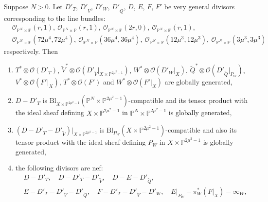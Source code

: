 \documentclass[10pt,a4paper]{amsart}
\newcommand{\BL}{\mathrm{Bl}}
\newcommand{\bP}{\mathbb{P}}
\newcommand{\calO}{\mathcal{O}}
\begin{document}
\begin{lemma} \label{lemmaWgloballygenerated}
	Suppose $N>0$.
	Let $D'_T$, $D'_{\widetilde{V}}$, $D'_W$, $D'_{\widetilde{Q}}$, $D$, $E$, $F$, $F'$ be very general divisors corresponding to the line bundles:
	\begin{equation}
		\begin{aligned}
			 & \calO_{\bP^N \times \bP}(r,1), \ \calO_{\bP^N \times \bP}(r,1), \ \calO_{\bP^N \times \bP}(2r,0), \ \calO_{\bP^N \times \bP}(r,1),                                             \\
			 & \calO_{\bP^N \times \bP}(72\mu^4,72\mu^4), \ \calO_{\bP^N \times \bP}(36\mu^4,36\mu^4), \ \calO_{\bP^N \times \bP}(12\mu^3,12\mu^3), \ \calO_{\bP^N \times \bP}(3\mu^3,3\mu^3)
		\end{aligned}
	\end{equation}
	respectively.
	Then
	\begin{enumerate}
		\item $T^* \otimes \calO(D'_T)$, $\widetilde{V}^* \otimes \calO(D'_{\widetilde{V}}|_{X \times \bP^{2\mu^2-1}})$, $W^* \otimes \calO(D'_W|_X)$, $\widetilde{Q}^* \otimes \calO(D'_{\widetilde{Q}}|_{P_W})$, $V^* \otimes \calO(F'|_X)$, $T^* \otimes \calO(F')$ and $W^* \otimes \calO(F'|_X)$ are globally generated,
		\item $D-D'_T$ is $\BL_{X \times \bP^{2\mu^2-1}}(\bP^N \times \bP^{2\mu^2-1})$-compatible and its tensor product with the ideal sheaf defining $X \times \bP^{2\mu^2-1}$ in $\bP^N \times \bP^{2\mu^2-1}$ is globally generated,
		\item $(D - D'_T - D'_{\widetilde{V}})|_{X \times \bP^{2\mu^2-1}}$ is $\BL_{P_W}(X \times \bP^{2\mu^2-1})$-compatible and also its tensor product with the ideal sheaf defining $P_W$ in $X \times \bP^{2\mu^2-1}$ is globally generated,
		\item the following divisors are nef:
		      \begin{equation} \label{eqndivisorstobenef}
			      \begin{aligned}
				       & D - D'_T, \quad D - D'_T - D'_{\widetilde{V}}, \quad D - E - D'_{\widetilde{Q}},                                                           \\
				       & E - D'_T - D'_{\widetilde{V}} - D'_{\widetilde{Q}}, \quad F - D'_T - D'_{\widetilde{V}} - D'_W, \quad E|_{P_W} - \pi_W^*(F|_X) - \infty_W,
			      \end{aligned}
		      \end{equation}

\end{enumerate}
\end{lemma}
\end{document}
